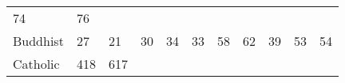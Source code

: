 \documentclass[]{article}
\begin{document}
\begin{longtable}[]{@{}lllllllllll@{}}
\begin{minipage}[t]{0.04\columnwidth}
74\strut
\end{minipage} & \begin{minipage}[t]{0.11\columnwidth}\raggedright\strut
76\strut
\end{minipage}\tabularnewline
\begin{minipage}[t]{0.14\columnwidth}\raggedright\strut
Buddhist\strut
\end{minipage} & \begin{minipage}[t]{0.04\columnwidth}\raggedright\strut
27\strut
\end{minipage} & \begin{minipage}[t]{0.05\columnwidth}\raggedright\strut
21\strut
\end{minipage} & \begin{minipage}[t]{0.05\columnwidth}\raggedright\strut
30\strut
\end{minipage} & \begin{minipage}[t]{0.05\columnwidth}\raggedright\strut
34\strut
\end{minipage} & \begin{minipage}[t]{0.05\columnwidth}\raggedright\strut
33\strut
\end{minipage} & \begin{minipage}[t]{0.05\columnwidth}\raggedright\strut
58\strut
\end{minipage} & \begin{minipage}[t]{0.06\columnwidth}\raggedright\strut
62\strut
\end{minipage} & \begin{minipage}[t]{0.06\columnwidth}\raggedright\strut
39\strut
\end{minipage} & \begin{minipage}[t]{0.04\columnwidth}\raggedright\strut
53\strut
\end{minipage} & \begin{minipage}[t]{0.11\columnwidth}\raggedright\strut
54\strut
\end{minipage}\tabularnewline
\begin{minipage}[t]{0.14\columnwidth}\raggedright\strut
Catholic\strut
\end{minipage} & \begin{minipage}[t]{0.04\columnwidth}\raggedright\strut
418\strut
\end{minipage} & \begin{minipage}[t]{0.05\columnwidth}\raggedright\strut
617\strut
\end{minipage} & \begin{minipage}[t]{0.05\columnwidth}\raggedright\strut

\end{minipage}
\end{longtable}
\end{document}
